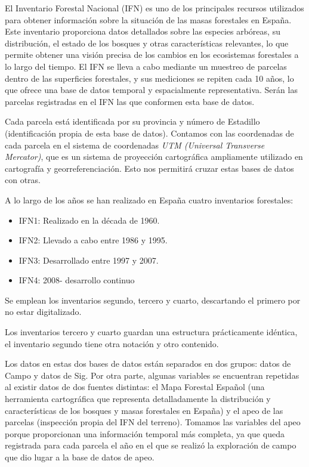 El Inventario Forestal Nacional (IFN) es uno de los principales recursos utilizados para obtener información sobre la situación de las masas forestales en España. Este inventario proporciona datos detallados sobre las especies arbóreas, su distribución, el estado de los bosques y otras características relevantes, lo que permite obtener una visión precisa de los cambios en los ecosistemas forestales a lo largo del tiempo. El IFN se lleva a cabo mediante un muestreo de parcelas dentro de las superficies forestales, y sus mediciones se repiten cada 10 años, lo que ofrece una base de datos temporal y espacialmente representativa. Serán las parcelas registradas en el IFN las que conformen esta base de datos. 

\medskip

Cada parcela está identificada por su provincia y número de Estadillo (identificación propia de esta base de datos). Contamos con las coordenadas de cada parcela en el sistema de coordenadas \textit{UTM (Universal Transverse Mercator)}, que es un sistema de proyección cartográfica ampliamente utilizado en cartografía y georreferenciación. Esto nos permitirá cruzar estas bases de datos con otras. 

\medskip

A lo largo de los años se han realizado en España cuatro inventarios forestales: 
\begin{itemize}
    \item IFN1: Realizado en la década de 1960.
    \item IFN2: Llevado a cabo entre 1986 y 1995.
    \item IFN3: Desarrollado entre 1997 y 2007.
    \item IFN4: 2008- desarrollo continuo 
\end{itemize}

Se emplean los inventarios segundo, tercero y cuarto, descartando el primero por no estar digitalizado.

\medskip

Los inventarios tercero y cuarto guardan una estructura prácticamente idéntica, el inventario segundo tiene otra notación y otro contenido.

 Los datos en estas dos bases de datos están separados en dos grupos: datos de Campo y datos de Sig. Por otra parte, algunas variables se encuentran repetidas al existir datos de dos fuentes distintas: el Mapa Forestal Español (una herramienta cartográfica que representa detalladamente la distribución y características de los bosques y masas forestales en España) y el apeo de las parcelas (inspección propia del IFN del terreno). Tomamos las variables del apeo porque proporcionan una información temporal más completa, ya que queda registrada para cada parcela el año en el que se realizó la exploración de campo que dio lugar a la base de datos de apeo.

